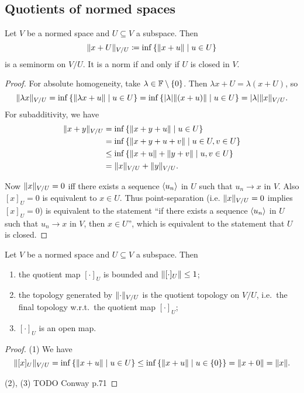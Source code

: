 \subsection{Quotients of normed spaces}
\begin{proposition}
Let $V$ be a normed space and $U\subseteq V$ a subspace. Then
\[ \norm{x+U}_{V/U} \defeq \inf\setbuilder{\norm{x+u}}{u\in U} \]
is a seminorm on $V/U$. It is a norm \textup{if and only if} $U$ is closed in $V$.
\end{proposition}
\begin{proof}
For absolute homogeneity, take $\lambda\in\mathbb{F}\setminus\{0\}$. Then $\lambda x+U = \lambda(x+U)$, so
\[ \norm{\lambda x}_{V/U} = \inf\setbuilder{\norm{\lambda x+u}}{u\in U} = \inf\setbuilder{|\lambda|\norm{(x+u)}}{u\in U} = |\lambda| \norm{x}_{V/U}. \]
For subadditivity, we have
\begin{align*}
\norm{x+y}_{V/U} &= \inf\setbuilder{\norm{x+y+u}}{u\in U} \\
&= \inf\setbuilder{\norm{x+y+u+v}}{u\in U, v\in U} \\
&\leq \inf\setbuilder{\norm{x+u}+\norm{y+v}}{u,v\in U} \\
&= \norm{x}_{V/U} + \norm{y}_{V/U}.
\end{align*}

Now $\lVert x\rVert_{V/U} = 0$ iff there exists a sequence $\left\langle u_n \right\rangle$ in $U$ such that $u_n\to x$ in $V$. Also $[x]_U = 0$ is equivalent to $x\in U$. Thus point-separation (i.e. $\lVert x\rVert_{V/U} = 0$ implies $[x]_U = 0$) is equivalent to the statement ``if there exists a sequence $\left\langle u_n \right\rangle$ in $U$ such that $u_n\to x$ in $V$, then $x\in U$'', which is equivalent to the statement that $U$ is closed.
\end{proof}

\begin{proposition}
Let $V$ be a normed space and $U\subseteq V$ a subspace. Then
\begin{enumerate}
\item the quotient map $[\cdot]_U$ is bounded and $\lVert[\cdot]_U\rVert\leq 1$;
\item the topology generated by $\lVert\cdot\rVert_{V/U}$ is the quotient topology on $V/U$, i.e.\ the final topology w.r.t.\ the quotient map $[\cdot]_U$;
\item $[\cdot]_U$ is an open map.
\end{enumerate}
\end{proposition}
\begin{proof}
(1) We have
\[ \norm{[x]_U}_{V/U} = \inf\setbuilder{\norm{x+u}}{u\in U} \leq \inf\setbuilder{\norm{x+u}}{u\in \{0\}} = \norm{x+0} = \norm{x}. \]

(2), (3) TODO Conway p.71
\end{proof}

